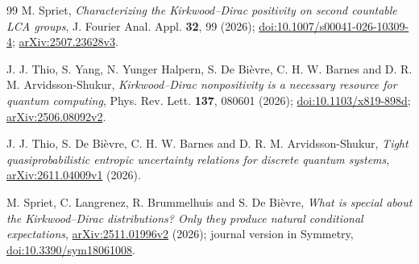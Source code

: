 \documentclass[11pt,a4paper]{article}
\theoremstyle{definition}
\theoremstyle{plain}
\begin{document}
\begin{thebibliography}{99}
M. Spriet,
\emph{Characterizing the Kirkwood--Dirac positivity on second countable LCA groups},
J. Fourier Anal. Appl. \textbf{32}, 99 (2026);
\href{https://doi.org/10.1007/s00041-026-10309-4}{doi:10.1007/s00041-026-10309-4};
\href{https://arxiv.org/abs/2507.23628v3}{arXiv:2507.23628v3}.

J. J. Thio, S. Yang, N. Yunger Halpern, S. De Bi\`evre, C. H. W. Barnes
and D. R. M. Arvidsson-Shukur,
\emph{Kirkwood--Dirac nonpositivity is a necessary resource for quantum computing},
Phys. Rev. Lett. \textbf{137}, 080601 (2026);
\href{https://doi.org/10.1103/x819-898d}{doi:10.1103/x819-898d};
\href{https://arxiv.org/abs/2506.08092v2}{arXiv:2506.08092v2}.

J. J. Thio, S. De Bi\`evre, C. H. W. Barnes and D. R. M. Arvidsson-Shukur,
\emph{Tight quasiprobabilistic entropic uncertainty relations for discrete
quantum systems},
\href{https://arxiv.org/abs/2611.04009v1}{arXiv:2611.04009v1} (2026).

M. Spriet, C. Langrenez, R. Brummelhuis and S. De Bi\`evre,
\emph{What is special about the Kirkwood--Dirac distributions? Only they
produce natural conditional expectations},
\href{https://arxiv.org/abs/2511.01996v2}{arXiv:2511.01996v2} (2026);
journal version in Symmetry,
\href{https://doi.org/10.3390/sym18061008}{doi:10.3390/sym18061008}.
\end{thebibliography}
\endgroup
\end{document}
